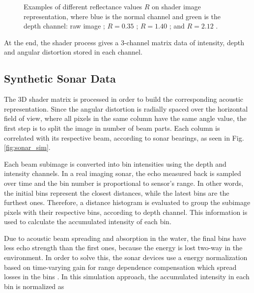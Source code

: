 \documentclass[final,5p,times]{elsarticle}
\begin{document}
\begin{figure}[h]
{        \label{fig:reflectance:2.12}
    }
    \captionsetup{justification=centering}
    \caption{Examples of different reflectance values $R$ on shader image representation, where blue is the normal channel and green is the depth channel: raw image ; $R = 0.35$ ; $R = 1.40$ ; and $R = 2.12$ .}
    \label{fig:sonar_reflectances}
\end{figure}

At the end, the shader process gives a 3-channel matrix data of intensity, depth and angular distortion stored in each channel.


\subsection{Synthetic Sonar Data}
\label{dev:sonardata}

The 3D shader matrix is processed in order to build the corresponding acoustic representation. Since the angular distortion is radially spaced over the horizontal field of view, where all pixels in the same column have the same angle value, the first step is to split the image in number of beam parts. Each column is correlated with its respective beam, according to sonar bearings, as seen in Fig. \ref{fig:sonar_sim}.

Each beam subimage is converted into bin intensities using the depth and intensity channels. In a real imaging sonar, the echo measured back is sampled over time and the bin number is proportional to sensor's range. In other words, the initial bins represent the closest distances, while the latest bins are the furthest ones. Therefore, a distance histogram is evaluated to group the subimage pixels with their respective bins, according to depth channel. This information is used to calculate the accumulated intensity of each bin.

Due to acoustic beam spreading and absorption in the water, the final bins have less echo strength than the first ones, because the energy is lost two-way in the environment. In order to solve this, the sonar devices use a energy normalization based on time-varying gain for range dependence compensation which spread losses in the bins \cite{urick2013}. In this simulation approach, the accumulated intensity in each bin is normalized as
\end{document}
